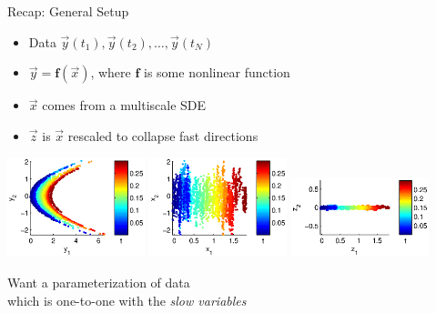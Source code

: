 \documentclass[12pt]{beamer}
\begin{document}
\begin{frame}{Recap: General Setup}


\begin{itemize}

\item Data $\vec{y}(t_1), \vec{y}(t_2), \dots, \vec{y}(t_N)$


\item $\vec{y} = \mathbf{f}(\vec{x})$, where $\mathbf{f}$ is some nonlinear function


\item $\vec{x}$ comes from a multiscale SDE


\item $\vec{z}$ is $\vec{x}$ rescaled to collapse fast directions



\end{itemize}

\centering
\includegraphics[width=0.3\textwidth]{data_init_nonlinear}
\hfill
\includegraphics[width=0.3\textwidth]{data_init}
\hfill
\includegraphics[width=0.3\textwidth]{data_rescaled}

 Want a parameterization of data \\which is one-to-one with the {\em slow variables}

\end{frame}
\end{document}
